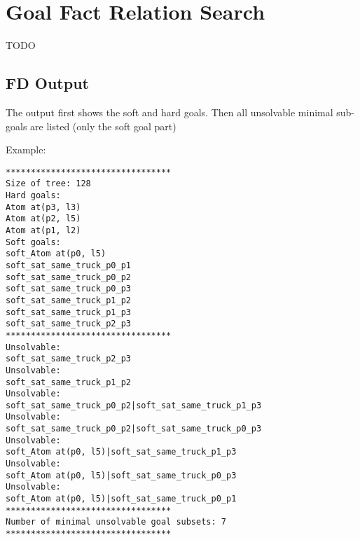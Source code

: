 \documentclass{article}
\begin{document}
\section{Goal Fact Relation Search}
TODO

\subsection{FD Output}
The output first shows the soft and hard goals.
Then all unsolvable minimal sub-goals are listed (only the soft goal part)


Example:

\begin{lstlisting}
*********************************
Size of tree: 128
Hard goals: 
Atom at(p3, l3)
Atom at(p2, l5)
Atom at(p1, l2)
Soft goals: 
soft_Atom at(p0, l5)
soft_sat_same_truck_p0_p1
soft_sat_same_truck_p0_p2
soft_sat_same_truck_p0_p3
soft_sat_same_truck_p1_p2
soft_sat_same_truck_p1_p3
soft_sat_same_truck_p2_p3
*********************************
Unsolvable:
soft_sat_same_truck_p2_p3
Unsolvable:
soft_sat_same_truck_p1_p2
Unsolvable:
soft_sat_same_truck_p0_p2|soft_sat_same_truck_p1_p3
Unsolvable:
soft_sat_same_truck_p0_p2|soft_sat_same_truck_p0_p3
Unsolvable:
soft_Atom at(p0, l5)|soft_sat_same_truck_p1_p3
Unsolvable:
soft_Atom at(p0, l5)|soft_sat_same_truck_p0_p3
Unsolvable:
soft_Atom at(p0, l5)|soft_sat_same_truck_p0_p1
*********************************
Number of minimal unsolvable goal subsets: 7
*********************************
\end{lstlisting}
\end{document}
